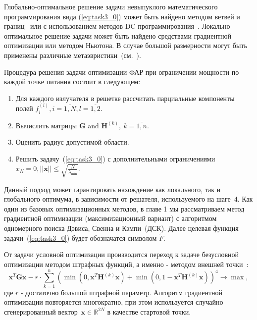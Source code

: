 Глобально-оптимальное решение задачи невыпуклого математического программирования вида (\ref{eq:task3_0}) может быть найдено методом
ветвей и границ~ или с использованием методов DC программирования~. Локально-оптимальное решение задачи может быть найдено средствами градиентной оптимизации или методом Ньютона. В случае большой размерности могут быть применены различные метаэвристики~(см.~).

Процедура решения задачи оптимизации ФАР при ограничении мощности по каждой точке питания состоит в следующем:
%
\begin{enumerate}
  \item Для каждого излучателя в решетке рассчитать парциальные компоненты полей $f_i^{(l)}, i= \overline{1,N}, l=\overline{1,2}$.
  \item Вычислить матрицы $\textbf{G}$ and ${\textbf{H}}^{(k)},\ k=\overline{1,n}$.
  \item Оценить радиус допустимой области.
  \item Решить задачу~(\ref{eq:task3_0}) с дополнительными ограничениями $x_N = 0, ||\textbf{x}||\le \sqrt{\frac{N}{\lambda_{\min}}}$.
\end{enumerate}

Данный подход может гарантировать нахождение как локального, так и глобального оптимума, в зависимости от решателя, используемого на шаге~4. Как один из базовых оптимизационных методов, в главе 1 мы рассматриваем метод градиентной оптимизации (максимизационный вариант)
с алгоритмом одномерного поиска Дэвиса, Свенна и Кэмпи~(ДСК). Далее целевая функция задачи~(\ref{eq:task3_0}) будет обозначатся символом $\tilde{F}$.

От задачи условной оптимизации производится переход к задаче безусловной оптимизации методом штрафных функций, а именно -
методом внешней точки~:
\begin{equation}
       \textbf{x}^{T}\textbf{Gx} - r\cdot \sum_{k=1}^n
       \left( \min\left(0,\textbf{x}^{T}\textbf{H}^{(k)}\textbf{x}\right) +
       \min\left(0,1-\textbf{x}^{T}\textbf{H}^{(k)}\textbf{x}\right)\right)^4 \rightarrow
       \max,
     \label{eq:task4}
\end{equation}
где $r$ - достаточно большой штрафной параметр. Алгоритм градиентной оптимизации повторяется многократно, при этом используется случайно сгенерированный вектор~$\textbf{x}\in \mathbb{R}^{2N}$ в качестве стартовой точки.

